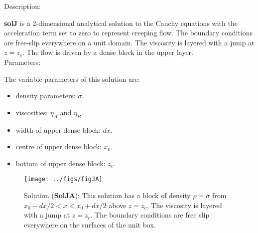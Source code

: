   {\large \fontB Description:}
  
  {\bf solJ} is a 2-dimensional analytical solution to the Cauchy equations with the acceleration term set to zero
  to represent creeping flow. The boundary conditions are free-slip everywhere on a unit domain. 
  The viscosity is layered with a jump at $ z=z_c $.
  The flow is driven by a dense block in the upper layer.
  \\

  {\large \fontB Parameters:}
 
  The variable parameters of this solution are:
  \begin{itemize}
    \item{density parameters: $ \sigma $.}
    \item{viscosities: $\eta_A$ and $\eta_B$.}
    \item{width of upper dense block: $dx$.}
    \item{centre of upper dense block: $x_0$.}
    \item{bottom of upper dense block: $z_c$.}
    \end{itemize}

  \begin{SCfigure}[][h]
    \texttt{[image: ../figs/figJA]}
    \caption[Short caption]{\label{figJA} 
      Solution ({\bf SolJA}):
      This solution has a block of density $\rho = \sigma$ from $x_{0}-dx/2 < x < x_{0}+dx/2$ above
      $ z= z_c$.
      The viscosity is layered with a jump at $ z=z_c $.
      The boundary conditions are free slip everywhere on the surfaces of the unit box.}
  \end{SCfigure} 
  

